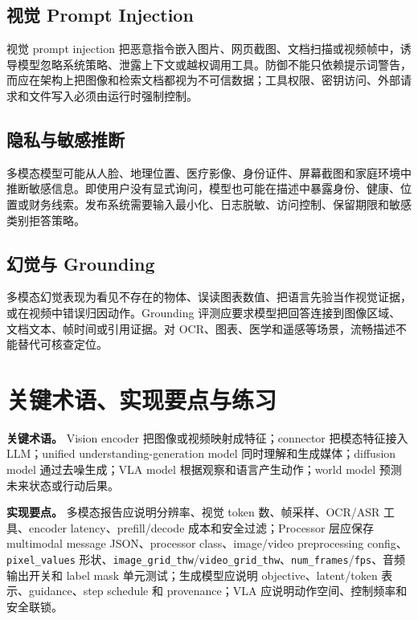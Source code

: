 \documentclass[UTF8,zihao=-4,openany]{ctexbook}
\begin{document}
\subsection{视觉 Prompt Injection}
视觉 prompt injection 把恶意指令嵌入图片、网页截图、文档扫描或视频帧中，诱导模型忽略系统策略、泄露上下文或越权调用工具。防御不能只依赖提示词警告，而应在架构上把图像和检索文档都视为不可信数据；工具权限、密钥访问、外部请求和文件写入必须由运行时强制控制。

\subsection{隐私与敏感推断}
多模态模型可能从人脸、地理位置、医疗影像、身份证件、屏幕截图和家庭环境中推断敏感信息。即使用户没有显式询问，模型也可能在描述中暴露身份、健康、位置或财务线索。发布系统需要输入最小化、日志脱敏、访问控制、保留期限和敏感类别拒答策略。

\subsection{幻觉与 Grounding}
多模态幻觉表现为看见不存在的物体、误读图表数值、把语言先验当作视觉证据，或在视频中错误归因动作。Grounding 评测应要求模型把回答连接到图像区域、文档文本、帧时间或引用证据。对 OCR、图表、医学和遥感等场景，流畅描述不能替代可核查定位。

\section{关键术语、实现要点与练习}
\textbf{关键术语。} Vision encoder 把图像或视频映射成特征；connector 把模态特征接入 LLM；unified understanding-generation model 同时理解和生成媒体；diffusion model 通过去噪生成；VLA model 根据观察和语言产生动作；world model 预测未来状态或行动后果。

\textbf{实现要点。} 多模态报告应说明分辨率、视觉 token 数、帧采样、OCR/ASR 工具、encoder latency、prefill/decode 成本和安全过滤；Processor 层应保存 multimodal message JSON、processor class、image/video preprocessing config、\texttt{pixel\_values} 形状、\texttt{image\_grid\_thw}/\texttt{video\_grid\_thw}、\texttt{num\_frames}/\texttt{fps}、音频输出开关和 label mask 单元测试；生成模型应说明 objective、latent/token 表示、guidance、step schedule 和 provenance；VLA 应说明动作空间、控制频率和安全联锁。
\end{document}

